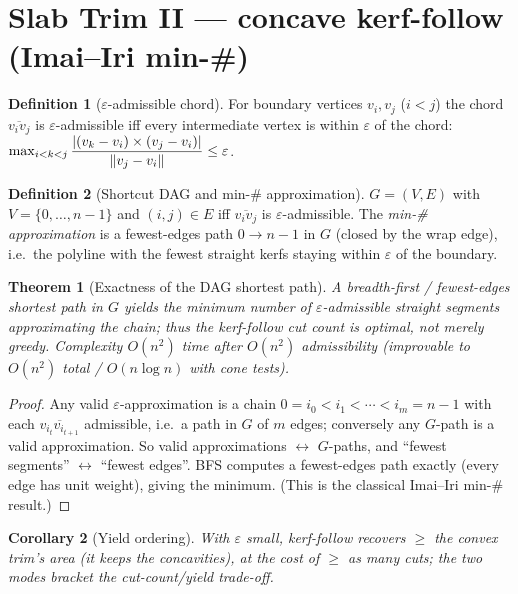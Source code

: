 \documentclass[11pt]{article}
\theoremstyle{definition}\newtheorem{definition}{Definition}[section]
\theoremstyle{plain}\newtheorem{theorem}{Theorem}[section]
\newtheorem{corollary}[theorem]{Corollary}
\begin{document}
\section{Slab Trim II --- concave kerf-follow (Imai--Iri min-\#)}
\begin{definition}[$\varepsilon$-admissible chord]
For boundary vertices $v_i,v_j$ ($i<j$) the chord $\overline{v_iv_j}$ is $\varepsilon$-admissible iff every
intermediate vertex is within $\varepsilon$ of the chord: $\max_{i<k<j}\dfrac{|(v_k-v_i)\times(v_j-v_i)|}{\lVert v_j-v_i\rVert}\le\varepsilon$.
\end{definition}
\begin{definition}[Shortcut DAG and min-\# approximation]
$G=(V,E)$ with $V=\{0,\dots,n-1\}$ and $(i,j)\in E$ iff $\overline{v_iv_j}$ is $\varepsilon$-admissible. The
\emph{min-\# approximation} is a fewest-edges path $0\to n-1$ in $G$ (closed by the wrap edge), i.e.\ the
polyline with the fewest straight kerfs staying within $\varepsilon$ of the boundary.
\end{definition}
\begin{theorem}[Exactness of the DAG shortest path]\label{thm:imaiiri}
A breadth-first / fewest-edges shortest path in $G$ yields the minimum number of $\varepsilon$-admissible
straight segments approximating the chain; thus the kerf-follow cut count is \emph{optimal}, not merely
greedy. Complexity $O(n^2)$ time after $O(n^2)$ admissibility (improvable to $O(n^2)$ total / $O(n\log n)$
with cone tests).
\end{theorem}
\begin{proof}
Any valid $\varepsilon$-approximation is a chain $0=i_0<i_1<\cdots<i_m=n-1$ with each
$\overline{v_{i_t}v_{i_{t+1}}}$ admissible, i.e.\ a path in $G$ of $m$ edges; conversely any $G$-path is a
valid approximation. So valid approximations $\leftrightarrow$ $G$-paths, and ``fewest segments''
$\leftrightarrow$ ``fewest edges''. BFS computes a fewest-edges path exactly (every edge has unit weight),
giving the minimum. (This is the classical Imai--Iri min-\# result.)
\end{proof}
\begin{corollary}[Yield ordering]
With $\varepsilon$ small, kerf-follow recovers $\ge$ the convex trim's area (it keeps the concavities), at
the cost of $\ge$ as many cuts; the two modes bracket the cut-count/yield trade-off.
\end{corollary}
\end{document}
